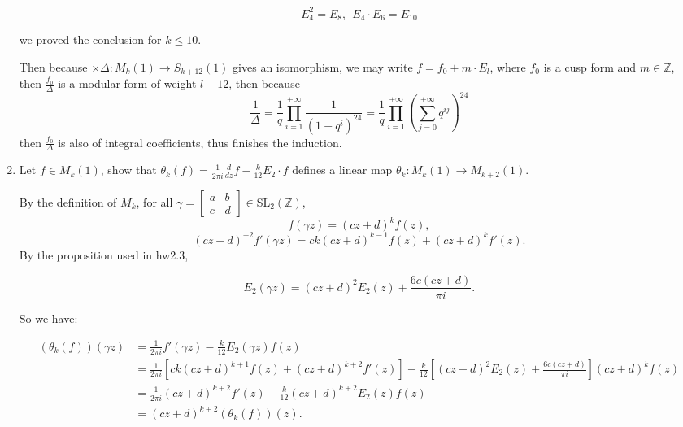 \begin{enumerate}[1]
\begin{proofc}[解答]
    \[E_4^2 = E_8, \ \  E_4 \cdot E_6 = E_{10}\]
    
    we proved the conclusion for $k \leq 10$.

    Then because $\times \Delta: M_k(1) \to S_{k+12}(1)$ gives an isomorphism, we may write $f = f_0 + m \cdot E_{l}$, where $f_0$ is a cusp form and $m \in \mathbb{Z}$, then $\displaystyle \frac{f_0}{\Delta}$ is a modular form of weight $l-12$, then because 
    $$\frac{1}{\Delta} = \frac1q \prod_{i=1}^{+\infty} \frac{1}{(1-q^i)^{24}} = \frac1q \prod_{i=1}^{+\infty} \left(\sum_{j=0}^{+\infty} q^{ij}\right)^{24}$$
    then $\displaystyle \frac{f_0}{\Delta}$ is also of integral coefficients, thus finishes the induction.
    \end{proofc}


    \item Let $f\in M_k(1)$, show that $\theta_k (f)=\frac{1}{2\pi i}\frac{d}{dz} f - \frac{k}{12}E_2\cdot f$  defines a linear map $\theta_k : M_k(1) \to M_{k+2}(1)$.
    \begin{proofc}[解答]
        By the definition of \(M_k\), for all \(\gamma = \begin{bmatrix}
        a & b \\
        c & d
        \end{bmatrix}\in \mathrm{SL}_2(\mathbb{Z})\),
        \[
        f(\gamma z) = (cz+d)^{k}f(z),
        \]
        \[
        (cz+d)^{-2}f'(\gamma z)=ck(cz+d)^{k-1}f(z)+(cz+d)^{k}f'(z).
        \]
        By the proposition used in hw2.3, 
        
        $$ E_2(\gamma z) = (cz+d)^2 E_2(z) + \frac{6c(cz+d)}{\pi i}.$$


        So we have:

        \begin{align}
        
        (\theta_k (f))(\gamma z) &= \frac{1}{2 \pi i}f'(\gamma z)
        -\frac{k}{12}E_2(\gamma z)f(z) \\
        &=\frac{1}{2 \pi i}[ck(cz+d)^{k+1}f(z)+(cz+d)^{k+2}f'(z)]
        -\frac{k}{12}[(cz+d)^2 E_2(z) + \frac{6c(cz+d)}{\pi i}](cz+d)^kf(z) \\
        &=\frac{1}{2 \pi i}(cz+d)^{k+2}f'(z)-\frac{k}{12}(cz+d)^{k+2} E_2(z)f(z) \\
        &=(cz+d)^{k+2}(\theta_k (f))(z).
   
        \end{align}
        
        

    \end{proofc}


\end{enumerate}
